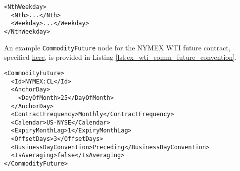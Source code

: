 \begin{listing}[h!]
\begin{verbatim}
<NthWeekday>
  <Nth>...</Nth>
  <Weekday>...</Weekday>
</NthWeekday>
\end{verbatim}
\caption{\textnormal{\lstinline!NthWeekday!} node outline}
\label{lst:nth_weekday_node}
\end{listing}

An example \lstinline!CommodityFuture! node for the NYMEX WTI future contract, specified \href{https://www.cmegroup.com/trading/energy/crude-oil/light-sweet-crude_contract_specifications.html}{here}, is provided in Listing \ref{lst:ex_wti_comm_future_convention}.

\begin{listing}[h!]
\begin{verbatim}
<CommodityFuture>
  <Id>NYMEX:CL</Id>
  <AnchorDay>
    <DayOfMonth>25</DayOfMonth>
  </AnchorDay>
  <ContractFrequency>Monthly</ContractFrequency>
  <Calendar>US-NYSE</Calendar>
  <ExpiryMonthLag>1</ExpiryMonthLag>
  <OffsetDays>3</OffsetDays>
  <BusinessDayConvention>Preceding</BusinessDayConvention>
  <IsAveraging>false</IsAveraging>
</CommodityFuture>
\end{verbatim}
\caption{NYMEX WTI \textnormal{\lstinline!CommodityFuture!} node}
\label{lst:ex_wti_comm_future_convention}
\end{listing}
